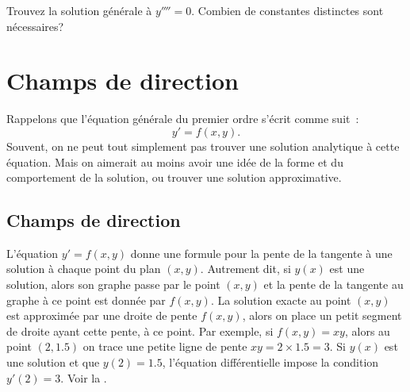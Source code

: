 \begin{exercise}
Trouvez la solution générale à $y''''= 0$.  Combien de constantes distinctes sont nécessaires?
\end{exercise}


\sectionnewpage
\section{Champs de direction}
\label{slopefields:section}


%

Rappelons que l'équation générale du premier ordre s'écrit comme suit \,: 
\begin{equation*}
y' = f(x,y).
\end{equation*}
Souvent, on ne peut tout simplement pas trouver une solution analytique à cette équation.  Mais on aimerait au moins avoir une idée de la forme et du comportement de la solution, ou trouver une solution approximative.

\subsection{Champs de direction}

L'équation $y' = f(x,y)$ donne une formule pour la pente de la tangente à une solution à chaque point du plan $(x,y)$. Autrement dit, si $y(x)$ est une solution, alors son graphe passe par le point $(x,y)$ et la pente de la tangente au graphe à ce point est donnée par $f(x,y)$. La solution exacte au point $(x,y)$ est approximée par une droite de pente $f(x,y)$, alors on place un petit segment de droite ayant cette pente, à ce point.
%
Par exemple, si $f(x,y)=xy$, alors au point $(2,1.5)$ on trace une petite ligne de pente $xy = 2 \times 1.5 = 3$.  Si $y(x)$ est une solution et que $y(2) = 1.5$, l'équation différentielle impose la condition $y'(2) = 3$.
Voir la .


